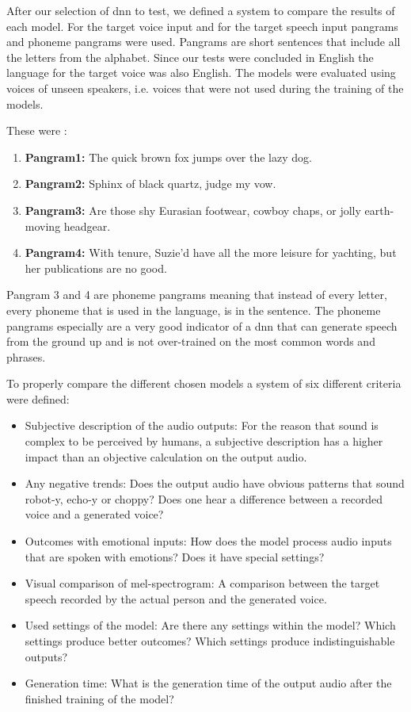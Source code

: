 After our selection of \gls{dnn} to test, we defined a system to compare the results of each model. For the target voice input and for the target speech input pangrams and phoneme pangrams were used. Pangrams are short sentences that include all the letters from the alphabet. Since our tests were concluded in English the language for the target voice was also English. The models were evaluated using voices of unseen speakers, i.e. voices that were not used during the training of the models.

These were :

\begin{enumerate}
    \item \textbf{Pangram1:} The quick brown fox jumps over the lazy dog.
    \item \textbf{Pangram2:} Sphinx of black quartz, judge my vow.
    \item \textbf{Pangram3:} Are those shy Eurasian footwear, cowboy chaps, or jolly earth-moving headgear.
    \item \textbf{Pangram4:} With tenure, Suzie'd have all the more leisure for yachting, but her publications are no good.
\end{enumerate}

Pangram 3 and 4 are phoneme pangrams meaning that instead of every letter, every phoneme that is used in the language, is in the sentence. The phoneme pangrams especially are a very good indicator of a \gls{dnn} that can generate speech from the ground up and is not over-trained on the most common words and phrases.

To properly compare the different chosen models a system of six different criteria were defined:

\begin{itemize}
    \item Subjective description of the audio outputs: For the reason that sound is complex to be perceived by humans, a subjective description has a higher impact than an objective calculation on the output audio.
    \item Any negative trends: Does the output audio have obvious patterns that sound robot-y, echo-y or choppy? Does one hear a difference between a recorded voice and a generated voice?
    \item Outcomes with emotional inputs: How does the model process audio inputs that are spoken with emotions? Does it have special settings?
    \item Visual comparison of mel-spectrogram: A comparison between the target speech recorded by the actual person and the generated voice.
    \item Used settings of the model: Are there any settings within the model? Which settings produce better outcomes? Which settings produce indistinguishable outputs?
    \item Generation time: What is the generation time of the output audio after the finished training of the model?
\end{itemize}
